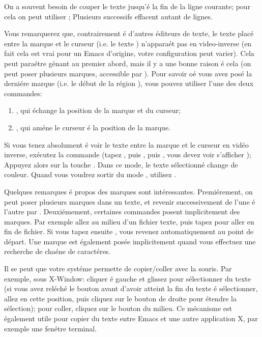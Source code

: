 On a souvent besoin de couper le texte jusqu'\'e la fin de la ligne
courante; pour cela on peut utiliser   ; Plusieurs
 successifs effacent autant de lignes.

Vous remarquerez que, contrairement \'e d'autres \'editeurs de texte, le
texte plac\'e entre la marque et le curseur (i.e. le texte
) n'appara\'et pas en video-inverse (en fait cela
est vrai pour un Emacs d'origine, votre configuration peut varier).
Cela peut para\'etre g\'enant au premier abord, mais il y a une bonne
raison \'e cela (on peut poser plusieurs marques, accessible par
   ).
Pour savoir o\'e vous avez pos\'e la derni\'ere marque (i.e. le d\'ebut de
la r\'egion ), vous pouvez utiliser l'une des deux
commandes:
\begin{enumerate}
\item  {}, qui \'echange la position de la marque et du curseur;
\item  {}, qui am\'ene le curseur \'e la position de la marque.
\end{enumerate}


Si vous tenez absolument \'e voir le texte entre la marque et le
curseur en vid\'eo inverse, ex\'ecutez la commande
 (tapez , puis ,
puis , vous devez voir s'afficher
); Appuyez alors sur la touche
. Dans ce mode, le texte s\'electionn\'e change de
couleur. Quand vous voudrez sortir du mode ,
utilisez  .

Quelques remarques \'e propos des marques sont int\'eressantes.
Premi\'erement, on peut poser plusieurs marques dans un texte, et
revenir successivement de l'une \'e l'autre par  
. Deuxi\'emement, certaines commandes posent
implicitement des marques. Par exemple allez au milieu d'un fichier
texte, puis tapez  pour aller en fin de fichier. Si vous
tapez ensuite  , vous revenez
automatiquement au point de d\'epart. Une marque est \'egalement pos\'ee
implicitement quand vous effectuez une recherche de cha\'ene de
caract\'eres.

Il se peut que votre syst\'eme permette de copier/coller avec la
souris. Par exemple, sous X-Window: cliquer \'e gauche et glissez pour
s\'electionner du texte (si vous avez rel\'ech\'e le bouton avant d'avoir
atteint la fin du texte \'e s\'electionner, allez en cette position,
puis cliquez sur le bouton de droite pour \'etendre la s\'election);
pour coller, cliquez sur le bouton du milieu. Ce m\'ecanisme est
\'egalement utile pour copier du texte entre Emacs et une autre
application X, par exemple une fen\'etre terminal.

